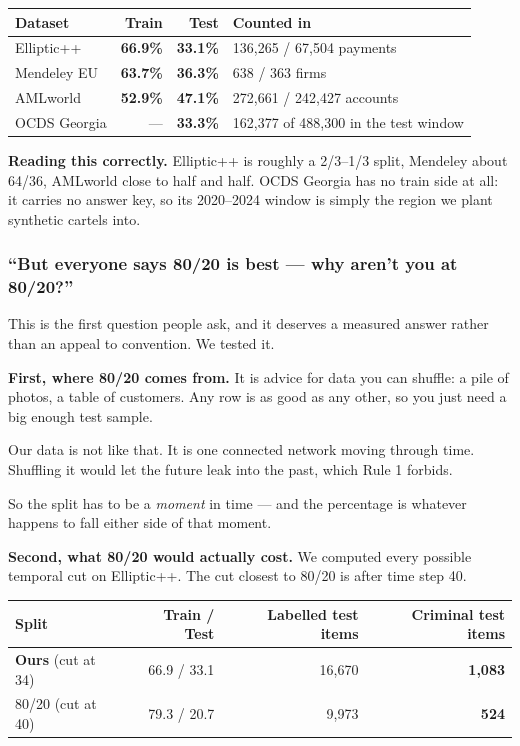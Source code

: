 \documentclass[11pt,a4paper]{article}
\begin{document}
\begin{center}\small
\begin{tabular}{@{}lrrl@{}}
\toprule
\textbf{Dataset} & \textbf{Train} & \textbf{Test} & \textbf{Counted in} \\
\midrule
Elliptic++ & \textbf{66.9\%} & \textbf{33.1\%} & 136{,}265 / 67{,}504 payments \\
Mendeley EU & \textbf{63.7\%} & \textbf{36.3\%} & 638 / 363 firms \\
AMLworld & \textbf{52.9\%} & \textbf{47.1\%} & 272{,}661 / 242{,}427 accounts \\
OCDS Georgia & --- & \textbf{33.3\%} & 162{,}377 of 488{,}300 in the test window \\
\bottomrule
\end{tabular}
\end{center}

\textbf{Reading this correctly.} Elliptic++ is roughly a 2/3--1/3 split, Mendeley
about 64/36, AMLworld close to half and half. OCDS Georgia has no train side at
all: it carries no answer key, so its 2020--2024 window is simply the region we
plant synthetic cartels into.

\subsubsection*{``But everyone says 80/20 is best --- why aren't you at 80/20?''}

This is the first question people ask, and it deserves a measured answer rather
than an appeal to convention. We tested it.

\textbf{First, where 80/20 comes from.} It is advice for data you can shuffle:
a pile of photos, a table of customers. Any row is as good as any other, so you
just need a big enough test sample.

Our data is not like that. It is one connected network moving through time.
Shuffling it would let the future leak into the past, which Rule 1 forbids.

So the split has to be a \emph{moment} in time --- and the percentage is
whatever happens to fall either side of that moment.

\textbf{Second, what 80/20 would actually cost.} We computed every possible
temporal cut on Elliptic++. The cut closest to 80/20 is after time step 40.

\begin{center}\small
\begin{tabular}{@{}lrrr@{}}
\toprule
\textbf{Split} & \textbf{Train / Test} & \textbf{Labelled test items} & \textbf{Criminal test items} \\
\midrule
\textbf{Ours} (cut at 34) & 66.9 / 33.1 & 16{,}670 & \textbf{1{,}083} \\
80/20 (cut at 40) & 79.3 / 20.7 & 9{,}973 & \textbf{524} \\
\bottomrule
\end{tabular}
\end{center}
\end{document}
